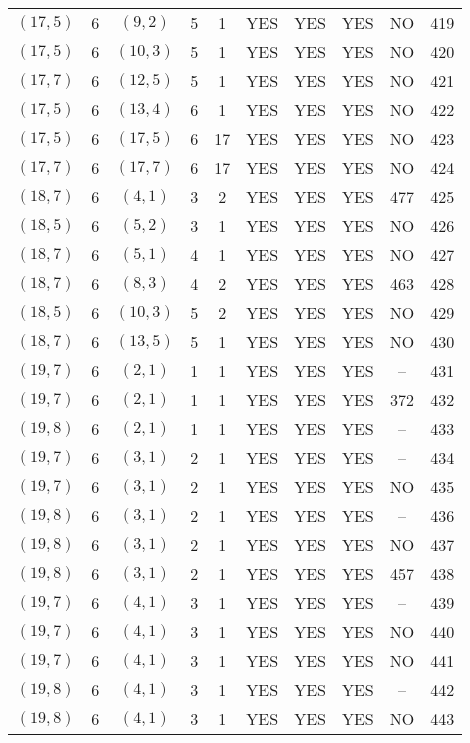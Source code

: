 \begin{longtable}{|c|c|c|c|c|c|c|c|c|c|}
$(17, 5)$ & 6 & $(9, 2)$ & 5 & 1 & YES & YES & YES & NO & 419\\
$(17, 5)$ & 6 & $(10, 3)$ & 5 & 1 & YES & YES & YES & NO & 420\\
$(17, 7)$ & 6 & $(12, 5)$ & 5 & 1 & YES & YES & YES & NO & 421\\
$(17, 5)$ & 6 & $(13, 4)$ & 6 & 1 & YES & YES & YES & NO & 422\\
$(17, 5)$ & 6 & $(17, 5)$ & 6 & 17 & YES & YES & YES & NO & 423\\
$(17, 7)$ & 6 & $(17, 7)$ & 6 & 17 & YES & YES & YES & NO & 424\\
$(18, 7)$ & 6 & $(4, 1)$ & 3 & 2 & YES & YES & YES & 477 & 425\\
$(18, 5)$ & 6 & $(5, 2)$ & 3 & 1 & YES & YES & YES & NO & 426\\
$(18, 7)$ & 6 & $(5, 1)$ & 4 & 1 & YES & YES & YES & NO & 427\\
$(18, 7)$ & 6 & $(8, 3)$ & 4 & 2 & YES & YES & YES & 463 & 428\\
$(18, 5)$ & 6 & $(10, 3)$ & 5 & 2 & YES & YES & YES & NO & 429\\
$(18, 7)$ & 6 & $(13, 5)$ & 5 & 1 & YES & YES & YES & NO & 430\\
$(19, 7)$ & 6 & $(2, 1)$ & 1 & 1 & YES & YES & YES & -- & 431\\
$(19, 7)$ & 6 & $(2, 1)$ & 1 & 1 & YES & YES & YES & 372 & 432\\
$(19, 8)$ & 6 & $(2, 1)$ & 1 & 1 & YES & YES & YES & -- & 433\\
$(19, 7)$ & 6 & $(3, 1)$ & 2 & 1 & YES & YES & YES & -- & 434\\
$(19, 7)$ & 6 & $(3, 1)$ & 2 & 1 & YES & YES & YES & NO & 435\\
$(19, 8)$ & 6 & $(3, 1)$ & 2 & 1 & YES & YES & YES & -- & 436\\
$(19, 8)$ & 6 & $(3, 1)$ & 2 & 1 & YES & YES & YES & NO & 437\\
$(19, 8)$ & 6 & $(3, 1)$ & 2 & 1 & YES & YES & YES & 457 & 438\\
$(19, 7)$ & 6 & $(4, 1)$ & 3 & 1 & YES & YES & YES & -- & 439\\
$(19, 7)$ & 6 & $(4, 1)$ & 3 & 1 & YES & YES & YES & NO & 440\\
$(19, 7)$ & 6 & $(4, 1)$ & 3 & 1 & YES & YES & YES & NO & 441\\
$(19, 8)$ & 6 & $(4, 1)$ & 3 & 1 & YES & YES & YES & -- & 442\\
$(19, 8)$ & 6 & $(4, 1)$ & 3 & 1 & YES & YES & YES & NO & 443\\

\end{longtable}
